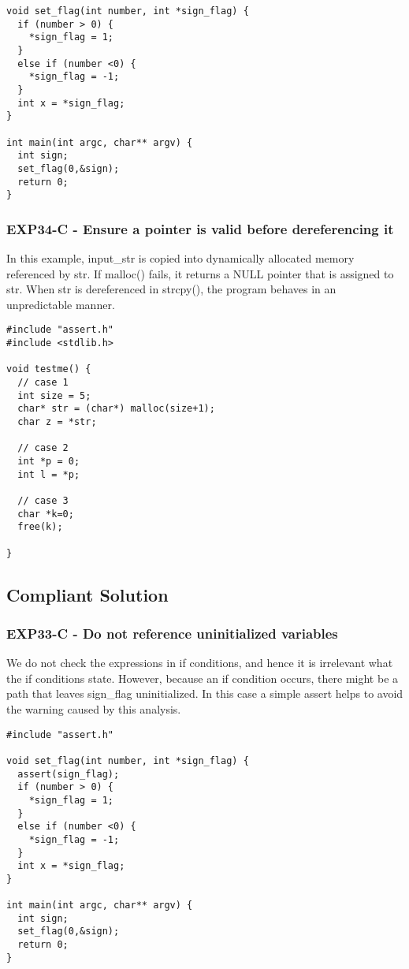 \begin{verbatim}
void set_flag(int number, int *sign_flag) {
  if (number > 0) {
    *sign_flag = 1;
  }
  else if (number <0) {
    *sign_flag = -1;
  }
  int x = *sign_flag;
}

int main(int argc, char** argv) {
  int sign;
  set_flag(0,&sign);
  return 0;
}
\end{verbatim}

\subsubsection{EXP34-C - Ensure a pointer is valid before dereferencing it}


In this example, input\_str is copied into dynamically allocated memory referenced by str. 
If malloc() fails, it returns a NULL pointer that is assigned to str. 
When str is dereferenced in strcpy(), the program behaves in an unpredictable manner.

\begin{verbatim}
#include "assert.h"
#include <stdlib.h>

void testme() {
  // case 1
  int size = 5;
  char* str = (char*) malloc(size+1);
  char z = *str;

  // case 2
  int *p = 0;
  int l = *p;
  
  // case 3
  char *k=0;
  free(k);

}
\end{verbatim}

\subsection{Compliant Solution}

\subsubsection{EXP33-C - Do not reference uninitialized variables}

We do not check the expressions in if conditions, and hence 
it is irrelevant what the if conditions state. However, because
an if condition occurs, there might be a path that leaves sign\_flag 
uninitialized. In this case a simple assert helps to avoid the
warning caused by this analysis.

\begin{verbatim}
#include "assert.h"

void set_flag(int number, int *sign_flag) {
  assert(sign_flag);
  if (number > 0) {
    *sign_flag = 1;
  }
  else if (number <0) {
    *sign_flag = -1;
  }
  int x = *sign_flag;
}

int main(int argc, char** argv) {
  int sign;
  set_flag(0,&sign);
  return 0;
}
\end{verbatim}

